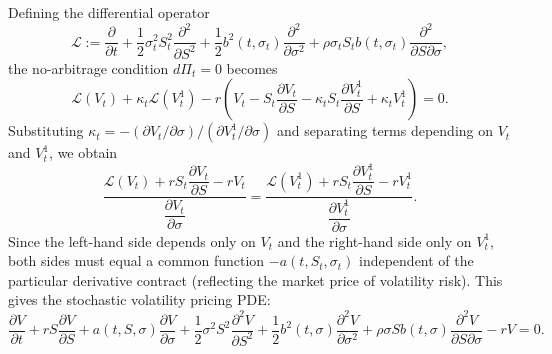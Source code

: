 Defining the differential operator
\[
    \mathcal{L} := \frac{\partial}{\partial t} + \frac{1}{2}\sigma_t^2 S_t^2 \frac{\partial^2}{\partial S^2} + \frac{1}{2}b^2(t, \sigma_t)\frac{\partial^2}{\partial \sigma^2} + \rho\sigma_t S_t b(t, \sigma_t)\frac{\partial^2}{\partial S \partial \sigma},
\]
the no-arbitrage condition $d\Pi_t = 0$ becomes
\[
    \mathcal{L}(V_t) + \kappa_t\mathcal{L}(V_t^1)
    - r\left(V_t - S_t\frac{\partial V_t}{\partial S} - \kappa_t S_t\frac{\partial V_t^1}{\partial S} + \kappa_t V_t^1\right) = 0.
\]
Substituting $\kappa_t = -(\partial V_t / \partial \sigma) / (\partial V_t^1 / \partial \sigma)$ and separating terms depending on $V_t$ and $V_t^1$, we obtain
\[
    \frac{\mathcal{L}(V_t) + r S_t \dfrac{\partial V_t}{\partial S} - r V_t}{\dfrac{\partial V_t}{\partial \sigma}}
    = \frac{\mathcal{L}(V_t^1) + r S_t \dfrac{\partial V_t^1}{\partial S} - r V_t^1}{\dfrac{\partial V_t^1}{\partial \sigma}}.
\]
Since the left-hand side depends only on $V_t$ and the right-hand side only on $V_t^1$, both sides must equal a common function $-a(t, S_t, \sigma_t)$ independent of the particular derivative contract (reflecting the market price of volatility risk). This gives the stochastic volatility pricing PDE:
\begin{equation}
    \label{eq:ch05-sv-pde}
    \frac{\partial V}{\partial t} + r S \frac{\partial V}{\partial S} + a(t, S, \sigma)\frac{\partial V}{\partial \sigma}
    + \frac{1}{2}\sigma^2 S^2 \frac{\partial^2 V}{\partial S^2} + \frac{1}{2}b^2(t, \sigma)\frac{\partial^2 V}{\partial \sigma^2} + \rho\sigma S b(t, \sigma)\frac{\partial^2 V}{\partial S \partial \sigma} - r V = 0.
\end{equation}

